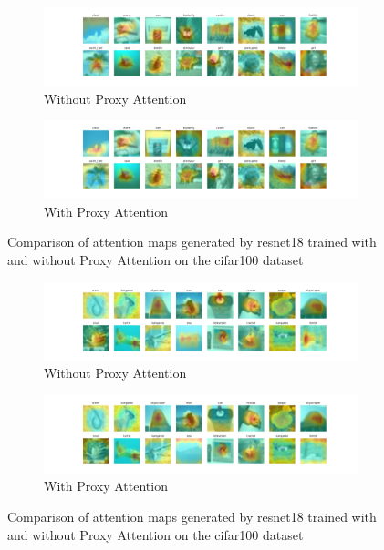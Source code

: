 \begin{figure}[!htb]
    \centering
    \begin{subfigure}[b]{1\textwidth}
        \includegraphics[width=\textwidth]{images/cifar100_resnet18_noproxy_2.pdf}
        \caption{Without Proxy Attention}
    \end{subfigure}
    \hfill
    \begin{subfigure}[b]{1\textwidth}
        \includegraphics[width=\textwidth]{images/cifar100_resnet18_proxy_2.pdf}
        \caption{With Proxy Attention}
    \end{subfigure}
    \caption{Comparison of attention maps generated by resnet18 trained with and without Proxy Attention on the cifar100 dataset}
\end{figure}


\begin{figure}[!htb]
    \centering
    \begin{subfigure}[b]{1\textwidth}
        \includegraphics[width=\textwidth]{images/cifar100_resnet18_noproxy_3.pdf}
        \caption{Without Proxy Attention}
    \end{subfigure}
    \hfill
    \begin{subfigure}[b]{1\textwidth}
        \includegraphics[width=\textwidth]{images/cifar100_resnet18_proxy_3.pdf}
        \caption{With Proxy Attention}
    \end{subfigure}
    \caption{Comparison of attention maps generated by resnet18 trained with and without Proxy Attention on the cifar100 dataset}
\end{figure}



